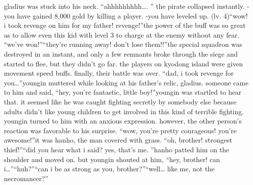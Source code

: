 gladius was stuck into his neck.
“ahhhhhhhhh….
” the pirate collapsed instantly.
-you have gained 8,000 gold by killing a player.
-you have leveled up.
 (lv.
 4)“wow! i took revenge on him for my father! revenge!”the power of the buff was so great as to allow even this kid with level 3 to charge at the enemy without any fear.
“we’ve won!”“they’re running away! don’t lose them!!”the special squadron was destroyed in an instant, and only a few remnants broke through the siege and started to flee, but they didn’t go far.
 the players on kyodong island were given movement speed buffs.
finally, their battle was over.
“dad, i took revenge for you…”youngin muttered while looking at his father’s relic, gladius.
someone came to him and said, “hey, you’re fantastic, little boy!”youngin was startled to hear that.
 it seemed like he was caught fighting secretly by somebody else because adults didn’t like young children to get involved in this kind of terrible fighting.
youngin turned to him with an anxious expression.
however, the other person’s reaction was favorable to his surprise.
“wow, you’re pretty courageous! you’re awesome!”it was hanho, the man covered with grass.
“oh, brother! strongest thief!”“did you hear what i said? yes, that’s me.
”hanho patted him on the shoulder and moved on.
but youngin shouted at him, “hey, brother! can i…”“huh?”“can i be as strong as you, brother?”“well… like me, not the necromancer?”

 